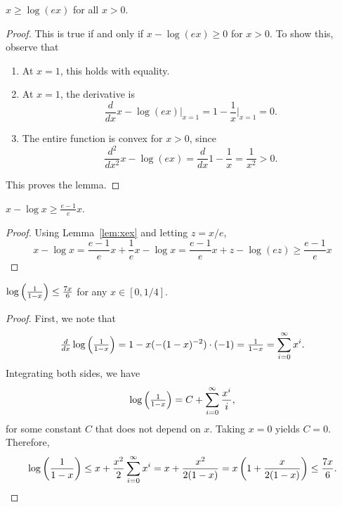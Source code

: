 \begin{lemma}
    $x \ge \log(ex)$ for all $x > 0$.
  \label{lem:xex}
\end{lemma}
\begin{proof}
  This is true if and only if $x - \log(ex) \ge 0$ for $x > 0$. To show this,
  observe that
  \begin{enumerate}
    \item At $x=1$, this holds with equality.
    \item At $x = 1$, the derivative is
      \[
        \frac{d}{dx} x - \log(ex) \bigg|_{x=1} = 1 - \frac{1}{x} \bigg|_{x=1} =
        0.
      \]
    \item The entire function is convex for $x > 0$, since
      \[
        \frac{d^2}{dx^2} x - \log(ex) = \frac{d}{dx} 1 - \frac{1}{x} =
        \frac{1}{x^2} > 0.
      \]
  \end{enumerate}
  This proves the lemma.
\end{proof}
\begin{corollary}
  $  x - \log x \ge \frac{e-1}{e} x$.
  \label{cor:e1ex}
\end{corollary}
\begin{proof}
  Using Lemma~\ref{lem:xex} and letting $z = x/e$,
  \[
    x - \log x = \frac{e-1}{e} x + \frac{1}{e}x - \log x = \frac{e-1}{e} x + z -
    \log(ez) \ge \frac{e-1}{e} x
  \]
\end{proof}
\begin{lemma}
$\log\left(\frac{1}{1-x}\right) \le \frac{7x}{6}$ for any $x \in [0,1/4]$.
  \label{lem:log_expansion}
\end{lemma}
\begin{proof}
  First, we note that
  \[
    \tfrac{d}{dx} \log\left(\tfrac{1}{1-x}\right) = 1-x (-(1-x)^{-2}) \cdot (-1)
    = \tfrac{1}{1-x}
    = \sum_{i=0}^\infty x^i.
  \]
  Integrating both sides, we have
  \[
    \log\left(\tfrac{1}{1-x}\right) = C + \sum_{i=0}^\infty \frac{x^i}{i},
  \]
  for some constant $C$ that does not depend on $x$. Taking $x = 0$ yields $C = 0$.
  Therefore,
  \[
    \log\left(\frac{1}{1-x}\right) \le x + \frac{x^2}{2} \sum_{i=0}^\infty x^i = x +
    \frac{x^2}{2(1-x)} = x\left(1 + \frac{x}{2(1-x)}\right) \le \frac{7x}{6}.
  \]
\end{proof}
